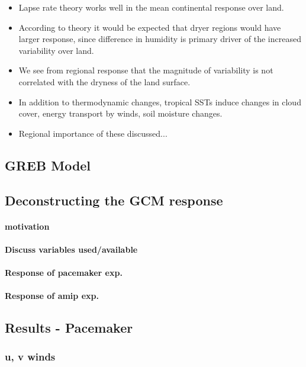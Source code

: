 \begin{itemize}
	\item Lapse rate theory works well in the mean continental response over 
		land.
	\item According to theory it would be expected that dryer regions would have 
		larger response, since difference in humidity is primary driver of the 
		increased variability over land.
	\item We see from regional response that the magnitude of variability is not 
		correlated with the dryness of the land surface.
	\item In addition to thermodynamic changes, tropical SSTs induce changes in 
		cloud cover, energy transport by winds, soil moisture changes.
	\item Regional importance of these discussed...
\end{itemize}


\subsection{GREB Model}

\subsection{Deconstructing the GCM response}
\paragraph{motivation}
\paragraph{Discuss variables used/available}
\paragraph{Response of pacemaker exp.}
\paragraph{Response of amip exp.}


\subsection{Results - Pacemaker}
\subsubsection{u, v winds}

